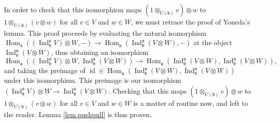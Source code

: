 \documentclass
[numbers=enddot,12pt,final,onecolumn,german,notitlepage]{scrartcl}%
\theoremstyle{definition}
\begin{document}
In order to check that this isomorphism maps $\left(  1\otimes_{U\left(
\mathfrak{b}\right)  }v\right)  \otimes w$ to $1\otimes_{U\left(
\mathfrak{b}\right)  }\left(  v\otimes w\right)  $ for all $v\in V$ and $w\in
W$, we must retrace the proof of Yoneda's lemma. This proof proceeds by
evaluating the natural isomorphism $\operatorname*{Hom}\nolimits_{\mathfrak{a}%
}\left(  \left(  \operatorname*{Ind}\nolimits_{\mathfrak{b}}^{\mathfrak{a}%
}V\right)  \otimes W,-\right)  \rightarrow\operatorname*{Hom}%
\nolimits_{\mathfrak{a}}\left(  \operatorname*{Ind}\nolimits_{\mathfrak{b}%
}^{\mathfrak{a}}\left(  V\otimes W\right)  ,-\right)  $ at the object
$\operatorname*{Ind}\nolimits_{\mathfrak{b}}^{\mathfrak{a}}\left(  V\otimes
W\right)  $, thus obtaining an isomorphism%
\[
\operatorname*{Hom}\nolimits_{\mathfrak{a}}\left(  \left(  \operatorname*{Ind}%
\nolimits_{\mathfrak{b}}^{\mathfrak{a}}V\right)  \otimes W,\operatorname*{Ind}%
\nolimits_{\mathfrak{b}}^{\mathfrak{a}}\left(  V\otimes W\right)  \right)
\rightarrow\operatorname*{Hom}\nolimits_{\mathfrak{a}}\left(
\operatorname*{Ind}\nolimits_{\mathfrak{b}}^{\mathfrak{a}}\left(  V\otimes
W\right)  ,\operatorname*{Ind}\nolimits_{\mathfrak{b}}^{\mathfrak{a}}\left(
V\otimes W\right)  \right)  ,
\]
and taking the preimage of $\operatorname*{id}\in\operatorname*{Hom}%
\nolimits_{\mathfrak{a}}\left(  \operatorname*{Ind}\nolimits_{\mathfrak{b}%
}^{\mathfrak{a}}\left(  V\otimes W\right)  ,\operatorname*{Ind}%
\nolimits_{\mathfrak{b}}^{\mathfrak{a}}\left(  V\otimes W\right)  \right)  $
under this isomorphism. This preimage is our isomorphism $\left(
\operatorname*{Ind}\nolimits_{\mathfrak{b}}^{\mathfrak{a}}V\right)  \otimes
W\rightarrow\operatorname*{Ind}\nolimits_{\mathfrak{b}}^{\mathfrak{a}}\left(
V\otimes W\right)  $. Checking that this maps $\left(  1\otimes_{U\left(
\mathfrak{b}\right)  }v\right)  \otimes w$ to $1\otimes_{U\left(
\mathfrak{b}\right)  }\left(  v\otimes w\right)  $ for all $v\in V$ and $w\in
W$ is a matter of routine now, and left to the reader. Lemma
\ref{lem.pushpull} is thus proven.
\end{document}
